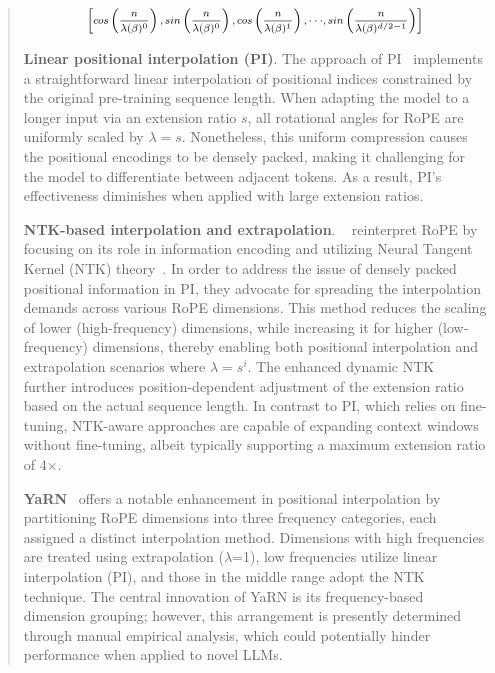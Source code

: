 \begin{abstract}
\begin{equation}	
	\fontsize{7.5}{7.5} \selectfont
	\label{eq:unified_rope}
	\begin{aligned}
		\left[cos\left(\frac{n}{\lambda(\beta)^0}\right), sin \left(\frac{n}{\lambda(\beta)^0}\right), cos\left(\frac{n}{\lambda(\beta)^1}\right), \cdot\cdot\cdot,  sin \left(\frac{n}{\lambda(\beta)^{d/2-1}}\right) \right]   
	\end{aligned}
\end{equation}

\textbf{Linear positional interpolation (PI)}. The approach of PI~\cite{pi} implements a straightforward linear interpolation of positional indices constrained by the original pre-training sequence length. When adapting the model to a longer input via an extension ratio $s$, all rotational angles for RoPE are uniformly scaled by $\lambda=s$. Nonetheless, this uniform compression causes the positional encodings to be densely packed, making it challenging for the model to differentiate between adjacent tokens. As a result, PI's effectiveness diminishes when applied with large extension ratios.

\textbf{NTK-based interpolation and extrapolation}. ~\cite{ntk,dynamicntk} reinterpret RoPE by focusing on its role in information encoding and utilizing Neural Tangent Kernel (NTK) theory~\cite{jacot2018neural,tancik2020fourier}. In order to address the issue of densely packed positional information in PI, they advocate for spreading the interpolation demands across various RoPE dimensions. This method reduces the scaling of lower (high-frequency) dimensions, while increasing it for higher (low-frequency) dimensions, thereby enabling both positional interpolation and extrapolation scenarios where $\lambda = s^{i}$. The enhanced dynamic NTK~\cite{dynamicntk} further introduces position-dependent adjustment of the extension ratio based on the actual sequence length. In contrast to PI, which relies on fine-tuning, NTK-aware approaches are capable of expanding context windows without fine-tuning, albeit typically supporting a maximum extension ratio of 4$\times$.

\textbf{YaRN}~\cite{yarn} offers a notable enhancement in positional interpolation by partitioning RoPE dimensions into three frequency categories, each assigned a distinct interpolation method. Dimensions with high frequencies are treated using extrapolation ($\lambda$=1), low frequencies utilize linear interpolation (PI), and those in the middle range adopt the NTK technique. The central innovation of YaRN is its frequency-based dimension grouping; however, this arrangement is presently determined through manual empirical analysis, which could potentially hinder performance when applied to novel LLMs.


\end{abstract}
